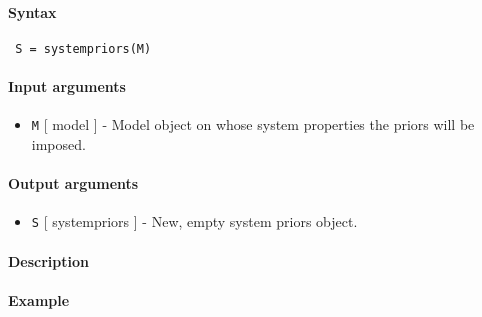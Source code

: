 


	\paragraph{Syntax}
 
 \begin{verbatim}
 S = systempriors(M)
 \end{verbatim}
 
 \paragraph{Input arguments}
 
 \begin{itemize}
 \item
   \texttt{M} {[} model {]} - Model object on whose system properties the
   priors will be imposed.
 \end{itemize}
 
 \paragraph{Output arguments}
 
 \begin{itemize}
 \item
   \texttt{S} {[} systempriors {]} - New, empty system priors object.
 \end{itemize}
 
 \paragraph{Description}
 
 \paragraph{Example}


